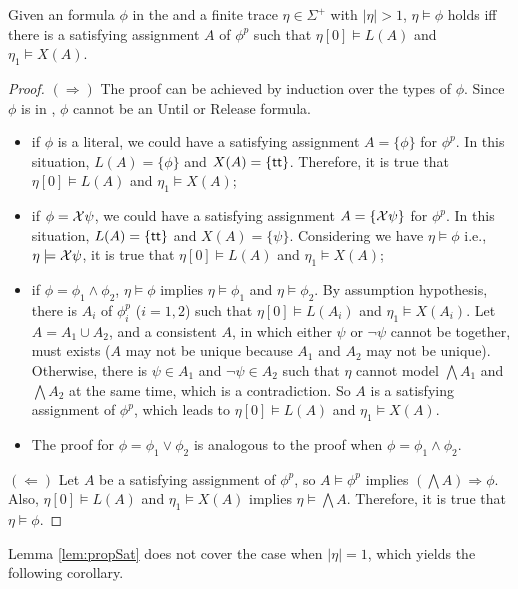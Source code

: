 \begin{lemma}\label{lem:propSat}
Given an \ltlf formula $\phi$ in the \XNF and a finite trace $\eta\in\Sigma^+$ with $|\eta|>1$, $\eta\models\phi$ holds iff there is a satisfying assignment $A$ of $\phi^p$ such that $\eta[0]\models L(A)$ and $\eta_1\models X(A)$.
\end{lemma}
\begin{proof}
$(\Rightarrow)$ The proof can be achieved by induction over the types of $\phi$. Since $\phi$ is in \XNF, $\phi$ cannot be an Until or Release formula.
\begin{itemize}
	\item if $\phi$ is a literal,  we could have a satisfying assignment $A=\{\phi\}$ for $\phi^p$. In this situation, $L(A)=\{\phi\}$ and $X(A)=\{\tt\}$. Therefore, it is true that $\eta[0]\models L(A)$ and $\eta_1\models X(A)$;
	\item if $\phi=\X\psi$, we could have a satisfying assignment $A=\{\X\psi\}$ for $\phi^p$. In this situation, $L(A)=\{\tt\}$ and $X(A)=\{\psi\}$. Considering we have $\eta\models\phi$ i.e., $\eta\models\X\psi$, it is true that $\eta[0]\models L(A)$ and $\eta_1\models X(A)$;
	\item if $\phi = \phi_1\wedge\phi_2$, $\eta\models\phi$ 
implies $\eta\models\phi_1$ and $\eta\models\phi_2$. By assumption hypothesis, there is $A_i$ of $\phi_i^p$ ($i=1,2$) such that 
$\eta[0]\models L(A_i)$ and $\eta_1\models X(A_i)$. Let $A = A_1\cup A_2$, and a consistent $A$, in which either $\psi$ or $\neg \psi$ cannot be together, 
must exists ($A$ may not be unique because $A_1$ and $A_2$ may not be unique). 
Otherwise, there is $\psi\in A_1$ and $\neg\psi\in A_2$ 
such that $\eta$ cannot model $\bigwedge A_1$ and $\bigwedge A_2$ at the same time, which is a contradiction. So $A$ is a satisfying  assignment of $\phi^p$, which leads to $\eta[0]\models L(A)$ and $\eta_1\models X(A)$. 
\item The proof for $\phi=\phi_1\vee\phi_2$ is analogous to the proof when $\phi = \phi_1\wedge\phi_2$.
\end{itemize} 

$(\Leftarrow)$ Let $A$ be a satisfying assignment of $\phi^p$, so $A\models\phi^p$ implies $(\bigwedge A)\Rightarrow \phi$. 
Also, $\eta[0]\models L(A)$ and $\eta_1\models X(A)$ implies $\eta\models \bigwedge A$. Therefore, it is true that $\eta\models \phi$.
\end{proof}

Lemma \ref{lem:propSat} does not cover the case when $|\eta|=1$, which yields the following corollary. 

